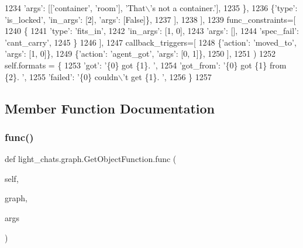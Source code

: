 \begin{DoxyCode}
1234                         \textcolor{stringliteral}{'args'}: [[\textcolor{stringliteral}{'container'}, \textcolor{stringliteral}{'room'}], \textcolor{stringliteral}{'That\(\backslash\)'s not a container.'}],
1235                     \},
1236                     \{\textcolor{stringliteral}{'type'}: \textcolor{stringliteral}{'is\_locked'}, \textcolor{stringliteral}{'in\_args'}: [2], \textcolor{stringliteral}{'args'}: [\textcolor{keyword}{False}]\},
1237                 ],
1238             ],
1239             func\_constraints=[
1240                 \{
1241                     \textcolor{stringliteral}{'type'}: \textcolor{stringliteral}{'fits\_in'},
1242                     \textcolor{stringliteral}{'in\_args'}: [1, 0],
1243                     \textcolor{stringliteral}{'args'}: [],
1244                     \textcolor{stringliteral}{'spec\_fail'}: \textcolor{stringliteral}{'cant\_carry'},
1245                 \}
1246             ],
1247             callback\_triggers=[
1248                 \{\textcolor{stringliteral}{'action'}: \textcolor{stringliteral}{'moved\_to'}, \textcolor{stringliteral}{'args'}: [1, 0]\},
1249                 \{\textcolor{stringliteral}{'action'}: \textcolor{stringliteral}{'agent\_got'}, \textcolor{stringliteral}{'args'}: [0, 1]\},
1250             ],
1251         )
1252         self.formats = \{
1253             \textcolor{stringliteral}{'got'}: \textcolor{stringliteral}{'\{0\} got \{1\}. '},
1254             \textcolor{stringliteral}{'got\_from'}: \textcolor{stringliteral}{'\{0\} got \{1\} from \{2\}. '},
1255             \textcolor{stringliteral}{'failed'}: \textcolor{stringliteral}{'\{0\} couldn\(\backslash\)'t get \{1\}. '},
1256         \}
1257 
\end{DoxyCode}


\subsection{Member Function Documentation}
\mbox{\label{classlight__chats_1_1graph_1_1GetObjectFunction_a36f3c298e8ac89d67ae856306d42a22d}} 
\subsubsection{\texorpdfstring{func()}{func()}}
{\footnotesize\ttfamily def light\+\_\+chats.\+graph.\+Get\+Object\+Function.\+func (\begin{DoxyParamCaption}\item[{}]{self,  }\item[{}]{graph,  }\item[{}]{args }\end{DoxyParamCaption})}


